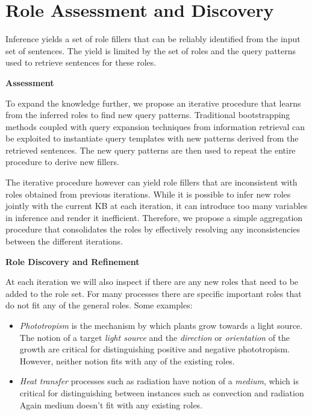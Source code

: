 \section{Role Assessment and Discovery}

Inference yields a set of role fillers that can be reliably identified from the input set of sentences. 
The yield is limited by the set of roles and the query patterns used to retrieve sentences for these roles.

{\bf Assessment}

To expand the knowledge further, we propose an iterative procedure that learns from the inferred roles to find new query patterns. 
Traditional bootstrapping methods coupled with query expansion techniques from information retrieval 
can be exploited to instantiate query templates with new patterns derived from the retrieved sentences. 
The new query patterns are then used to repeat the entire procedure to derive new fillers. 

The iterative procedure however can yield role fillers that are inconsistent with roles obtained from previous iterations.
While it is possible to infer new roles jointly with the current KB at each iteration, it can introduce too many variables in inference and render it inefficient.
Therefore, we propose a simple aggregation procedure that consolidates the roles by effectively resolving any inconsistencies between the different iterations.

{\bf Role Discovery and Refinement}

At each iteration we will also inspect if there are any new roles that need to be added to the role set.
For many processes there are specific important roles that do not fit any of the general roles. Some examples:
	\begin{itemize}
		\item {\em Phototropism} is the mechanism by which plants grow towards a light source. 
		The notion of a target {\em light source} and the {\em direction} or {\em orientation} of the growth
		are critical for distinguishing positive and negative phototropism. However, neither notion fits
		with any of the existing roles. 
	\item {\em Heat transfer} processes such as radiation have notion of a {\em medium}, 
		which is critical for distinguishing between instances such as convection and radiation
		Again medium doesn't fit with any existing roles. 
	\end{itemize}

